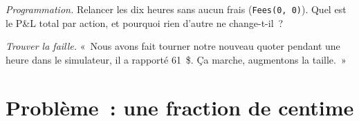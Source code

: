 \begin{exercise}[$\star\star\star$]\label{exo:hf:the-business-of-market-making:7}
\emph{Programmation.} Relancer les dix heures sans aucun frais (\texttt{Fees(0, 0)}). Quel est le P\&L total par action, et pourquoi rien d'autre ne change-t-il~?
\end{exercise}

\begin{exercise}[$\star\star\star$]\label{exo:hf:the-business-of-market-making:8}
\emph{Trouver la faille.} «~Nous avons fait tourner notre nouveau quoter pendant une heure dans le simulateur, il a rapporté 61~\$. Ça marche, augmentons la taille.~»
\end{exercise}

\section{Problème~: une fraction de centime}

